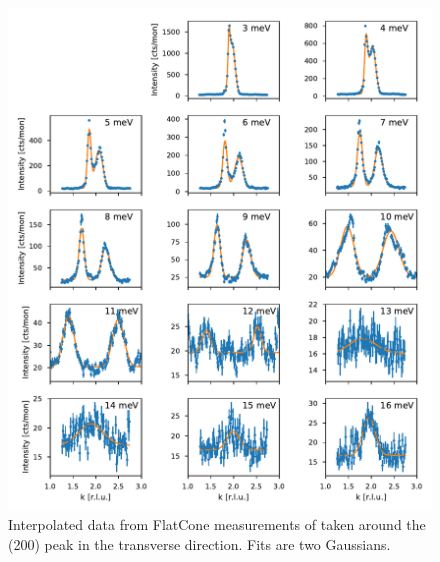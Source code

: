\begin{figure}
    \centering
    \includegraphics[width=\textwidth]{fig/lowen/fits_220T.pdf}
    \caption[220T flatcone raw data]{Interpolated data from FlatCone measurements of \LSCOOsix{} taken around the (200) peak in the transverse direction. Fits are two Gaussians.}
    \label{fig:flatcone_phonons_220T_raw}
\end{figure}

